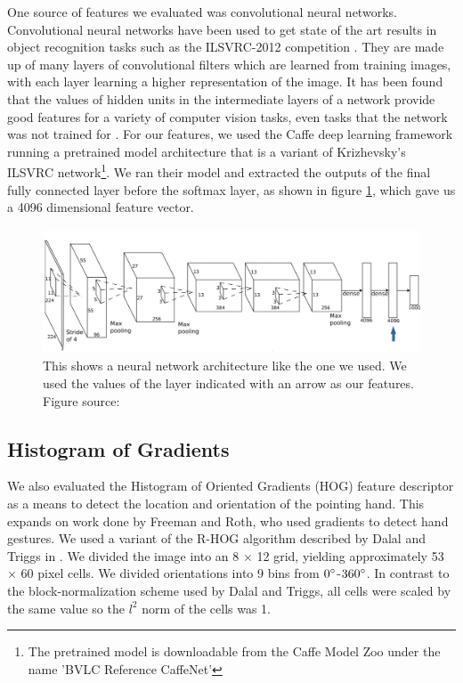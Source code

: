 \documentclass[10pt,twocolumn,letterpaper]{article}
\begin{document}
One source of features we evaluated was convolutional neural networks.  Convolutional neural networks have been used to get state of the art results in object recognition tasks such as the ILSVRC-2012 competition \cite{krizhevsky2012imagenet}.  They are made up of many layers of convolutional filters which are learned from training images, with each layer learning a higher representation of the image.   It has been found that the values of hidden units in the intermediate layers of a network provide good features for a variety of computer vision tasks, even tasks that the network was not trained for \cite{donahue2013decaf}.  For our features, we used the Caffe deep learning framework\cite{jia2014caffe} running a pretrained model architecture that is a variant of Krizhevsky's ILSVRC network\cite{krizhevsky2012imagenet}\footnote{The pretrained model is downloadable from the Caffe Model Zoo under the name 'BVLC Reference CaffeNet'}.  We ran their model and extracted the outputs of the final fully connected layer before the softmax layer, as shown in figure \ref{fig:cnn}, which gave us a 4096 dimensional feature vector.

\begin{figure}[b]
	\begin{center}
		\includegraphics[height=140px]{figures/cnn.png}
	\end{center}
	\caption{This shows a neural network architecture like the one we used.  We used the values of the layer indicated with an arrow as our features.  Figure source: \cite{krizhevsky2012presentation}}
	\label{fig:cnn}
\end{figure}

\subsection{Histogram of Gradients}

We also evaluated the Histogram of Oriented Gradients (HOG) feature descriptor \cite{dalal2005histograms} as a means to detect the location and orientation of the pointing hand. This expands on work done by Freeman and Roth, who used gradients to detect hand gestures\cite{freeman1995orientation}. We used a variant of the R-HOG algorithm described by Dalal and Triggs in \cite{dalal2005histograms}. We divided the image into an 8 $\times$ 12 grid, yielding approximately 53 $\times$ 60 pixel cells. We divided orientations into 9 bins from $0\degree$-$360\degree$. In contrast to the block-normalization scheme used by Dalal and Triggs, all cells were scaled by the same value so the $l^2$ norm of the cells was 1.
\end{document}
